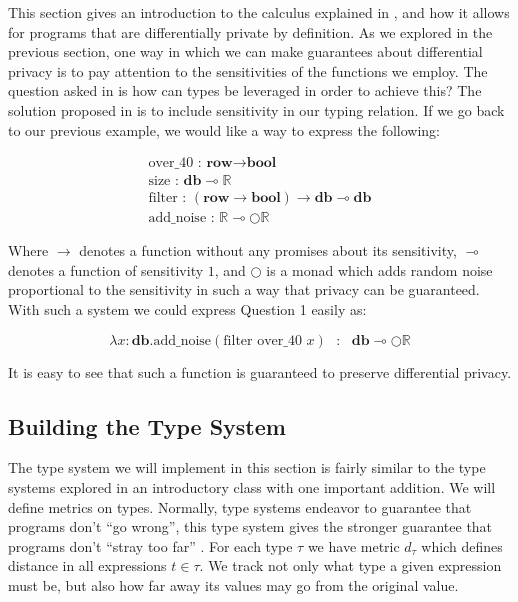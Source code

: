 \documentclass[11pt]{article}
\begin{document}
This section gives an introduction to the calculus explained in \cite{reed2010}, and how it allows for programs that are differentially private by definition. As we explored in the previous section, one way in which we can make guarantees about differential privacy is to pay attention to the sensitivities of the functions we employ. The question asked in \cite{reed2010} is how can types be leveraged in order to achieve this? The solution proposed in \cite{reed2010} is to include sensitivity in our typing relation. If we go back to our previous example, we would like a way to express the following:

\begin{align*}
  \text{over\_40 : } \textbf{row} \rightarrow \textbf{bool}\\
  \text{size : } \textbf{db}  \multimap \mathbb{R}\\
  \text{filter : } (\textbf{row} \rightarrow \textbf{bool}) \rightarrow \textbf{db} \multimap \textbf{db} \\
  \text{add\_noise : } \mathbb{R} \multimap \bigcirc \mathbb{R} 
\end{align*}

Where $\rightarrow$ denotes a function without any promises about its sensitivity, $\multimap$ denotes a function of sensitivity $1$, and $\bigcirc$ is a monad which adds random noise proportional to the sensitivity in such a way that privacy can be guaranteed. With such a system we could express Question 1 easily as:

$$\lambda x:\textbf{db} . \text{add\_noise}(\text{filter over\_40 } x)\text{ } : \text{ } \textbf{db} \multimap \bigcirc \mathbb{R}$$

It is easy to see that such a function is guaranteed to preserve differential privacy.

\subsection{Building the Type System}

The type system we will implement in this section is fairly similar to the type systems explored in an introductory class with one important addition. We will define metrics on types. Normally, type systems endeavor to guarantee that programs don't ``go wrong'', this type system gives the stronger guarantee that programs don't ``stray too far'' \cite{reed2010}. For each type $\tau$ we have metric $d_\tau$ which defines distance in all expressions $t \in \tau$. We track not only what type a given expression must be, but also how far away its values may go from the original value.
\end{document}
